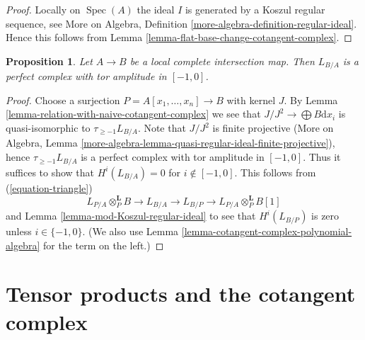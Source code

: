 \documentclass{stacks-project}
\theoremstyle{plain}
\newtheorem{proposition}[subsection]{Proposition}
\theoremstyle{definition}
\theoremstyle{remark}
\numberwithin{equation}{subsection}
\def\Spec{\mathop{\mathrm{Spec}}}
\begin{document}
\begin{proof}
Locally on $\Spec(A)$ the ideal $I$ is generated by a Koszul regular
sequence, see More on Algebra, Definition
\ref{more-algebra-definition-regular-ideal}.
Hence this follows from
Lemma \ref{lemma-flat-base-change-cotangent-complex}.
\end{proof}

\begin{proposition}
\label{proposition-cotangent-complex-local-complete-intersection}
Let $A \to B$ be a local complete intersection map.
Then $L_{B/A}$ is a perfect complex with tor amplitude in $[-1, 0]$.
\end{proposition}

\begin{proof}
Choose a surjection $P = A[x_1, \ldots, x_n] \to B$ with kernel $J$.
By Lemma \ref{lemma-relation-with-naive-cotangent-complex}
we see that $J/J^2 \to \bigoplus B\text{d}x_i$
is quasi-isomorphic to $\tau_{\geq -1}L_{B/A}$.
Note that $J/J^2$ is finite projective
(More on Algebra, Lemma
\ref{more-algebra-lemma-quasi-regular-ideal-finite-projective}),
hence $\tau_{\geq -1}L_{B/A}$ is a perfect complex with
tor amplitude in $[-1, 0]$.
Thus it suffices to show that $H^i(L_{B/A}) = 0$ for $i \not \in [-1, 0]$.
This follows from (\ref{equation-triangle})
$$
L_{P/A} \otimes_P^\mathbf{L} B \to L_{B/A} \to L_{B/P} \to
L_{P/A} \otimes_P^\mathbf{L} B[1]
$$
and Lemma \ref{lemma-mod-Koszul-regular-ideal}
to see that $H^i(L_{B/P})$ is zero unless $i \in \{-1, 0\}$.
(We also use Lemma \ref{lemma-cotangent-complex-polynomial-algebra}
for the term on the left.)
\end{proof}








\section{Tensor products and the cotangent complex}
\label{section-tensor-product}
\end{document}
